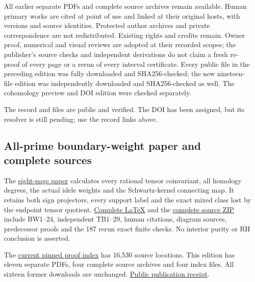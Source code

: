 \documentclass[
]{article}
\begin{document}
All earlier separate PDFs and complete source archives remain available.
Human primary works are cited at point of use and linked at their
original hosts, with versions and source identities. Protected author
archives and private correspondence are not redistributed. Existing
rights and credits remain. Owner proof, numerical and visual reviews are
adopted at their recorded scopes; the publisher's source checks and
independent derivations do not claim a fresh re-proof of every page or a
rerun of every interval certificate. Every public file in the preceding
edition was fully downloaded and SHA256-checked; the new nineteen-file
edition was independently downloaded and SHA256-checked as well. The
cohomology preview and DOI edition were checked separately.

The record and files are public and verified. The DOI has been assigned,
but its resolver is still pending; use the record links above.

\subsection{All-prime boundary-weight paper and complete
sources}\label{all-prime-boundary-weight-paper-and-complete-sources}

The
\href{https://zenodo.org/records/22920941/files/017-splitzero-all-prime-boundary-weights.pdf?download=1}{eight-page
paper} calculates every rational tensor coinvariant, all homology
degrees, the actual idele weights and the Schwartz-kernel connecting
map. It retains both sign projectors, every support label and the exact
mixed class lost by the endpoint tensor quotient.
\href{https://github.com/KokunoYumeto/zeta-function-research-reader/blob/e1dc06aa68bb810cf7d8b0006942f5b036b8b765/workbenches/splitzero-tandem/continuations/20260923-retained-source-readers/all-prime-boundary-weights/ROOT_BOUNDARY_WEIGHT_HOMOLOGY.tex}{Complete
LaTeX} and the
\href{https://zenodo.org/records/22920941/files/018-splitzero-boundary-weights-complete-sources.zip?download=1}{complete
source ZIP} include BW1--24, independent TB1--29, human citations,
diagram sources, predecessor proofs and the 187 rerun exact finite
checks. No interior purity or RH conclusion is asserted.

The
\href{https://zenodo.org/records/22920941/files/019-splitzero-pinned-proof-index.json?download=1}{current
pinned proof index} has 16,530 source locations. This edition has eleven
separate PDFs, four complete source archives and four index files. All
sixteen former downloads are unchanged.
\href{PUBLICATION_RECEIPT.json}{Public publication receipt}.
\end{document}
